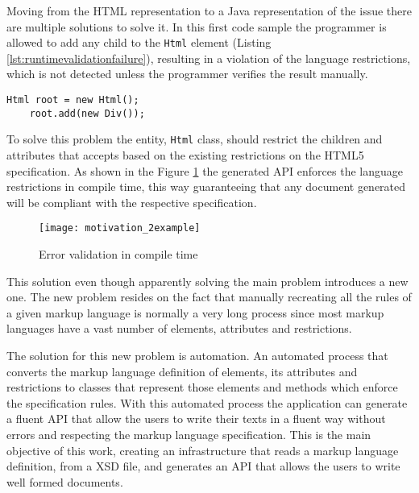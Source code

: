 \noindent
Moving from the \ac{HTML} representation to a Java representation of the issue there are multiple solutions to solve it. In this first code sample the programmer is allowed to add any child to the \texttt{Html} element (Listing \ref{lst:runtimevalidationfailure}), resulting in a violation of the language restrictions, which is not detected unless the programmer verifies the result manually.

\bigskip


\begin{lstlisting}[caption={Lack of rule validation},captionpos=b,label={lst:runtimevalidationfailure}]
	Html root = new Html();
	root.add(new Div());
\end{lstlisting}

\noindent
To solve this problem the entity, \texttt{Html} class, should restrict the children and attributes that accepts based on the existing restrictions on the \ac{HTML}5 specification. As shown in the Figure \ref{motivation_2example} the generated \ac{API} enforces the language restrictions in compile time, this way guaranteeing that any document generated will be compliant with the respective specification.

\begin{figure}[h]
	\centering
	\texttt{[image: motivation\_2example]}
	\caption{Error validation in compile time}
	\label{motivation_2example}
\end{figure}

\newpage

\noindent
This solution even though apparently solving the main problem introduces a new one. The new problem resides on the fact that manually recreating all the rules of a given markup language is normally a very long process since most markup languages have a vast number of elements, attributes and restrictions. 

\noindent
The solution for this new problem is automation. An automated process that converts the markup language definition of elements, its attributes and restrictions to classes that represent those elements and methods which enforce the specification rules. With this automated process the application can generate a fluent \ac{API} that allow the users to write their texts in a fluent way without errors and respecting the markup language specification. This is the main objective of this work, creating an infrastructure that reads a markup language definition, from a \ac{XSD} file, and generates an \ac{API} that allows the users to write well formed documents.


